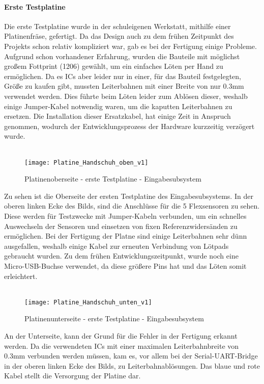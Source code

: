 \documentclass[titlepage,12pt,twoside]{article}
\begin{document}
\paragraph{Erste Testplatine}
\hfill \break
\hfill \break
Die erste Testplatine wurde in der schuleigenen Werkstatt, mithilfe einer Platinenfräse,
gefertigt. Da das Design auch zu dem frühen Zeitpunkt des Projekts schon relativ kompliziert
war, gab es bei der Fertigung einige Probleme. Aufgrund schon vorhandener Erfahrung,
wurden die Bauteile mit möglichst großem Fottprint (1206) gewählt, um ein einfaches Löten
per Hand zu ermöglichen. Da es ICs aber leider nur in einer, für das Bauteil festgelegten,
Größe zu kaufen gibt, mussten Leiterbahnen mit einer Breite von nur 0.3mm verwendet
werden. Dies führte beim Löten leider zum Ablösen dieser, weshalb einige Jumper-Kabel
notwendig waren, um die kaputten Leiterbahnen zu ersetzen. Die Installation dieser Ersatzkabel,
hat einige Zeit in Anspruch genommen, wodurch der Entwicklungsprozess der Hardware
kurzzeitig verzögert wurde. \\
\\
\begin{figure}[H]
	\begin{center}
		\scalebox{0.8}
		{\texttt{[image: Platine\_Handschuh\_oben\_v1]}}
		\caption{Platinenoberseite - erste Testplatine - Eingabesubsystem}
		\label{fig:Platine_Handschuh_oben_v1}		
	\end{center}
\end{figure}
\hfill \break
Zu sehen ist die Oberseite der ersten Testplatine des Eingabesubsystems. In der oberen linken Ecke des Bilds, sind die Anschlüsse für die 5 Flexsensoren zu sehen. Diese werden für Testzwecke mit 
Jumper-Kabeln verbunden, um ein schnelles Auswechseln der Sensoren und einsetzen von fixen Referenzwidersänden zu ermöglichen. Bei der Fertigung der Platne sind einige Leiterbahnen sehr dünn ausgefallen, 
weshalb einige Kabel zur erneuten Verbindung von Lötpads gebraucht wurden. Zu dem frühen Entwicklungszeitpunkt, wurde noch eine Micro-USB-Buchse verwendet, da diese größere Pins hat und das Löten somit erleichtert. \\
\\

\begin{figure}[H]
	\begin{center}
		\scalebox{0.8}
		{\texttt{[image: Platine\_Handschuh\_unten\_v1]}}
		\caption{Platinenunterseite - erste Testplatine - Eingabesubsystem}
		\label{fig:Platine_Handschuh_unten_v1}	
	\end{center}
\end{figure}
\hfill \break
An der Unterseite, kann der Grund für die Fehler in der Fertigung erkannt werden. Da die verwendeten ICs mit einer maximalen Leiterbahnbreite von 0.3mm verbunden werden müssen, kam es, vor allem bei der Serial-UART-Bridge in der
oberen linken Ecke des Bilds, zu Leiterbahnablösungen. Das blaue und rote Kabel stellt die Versorgung der Platine dar. 
\end{document}
